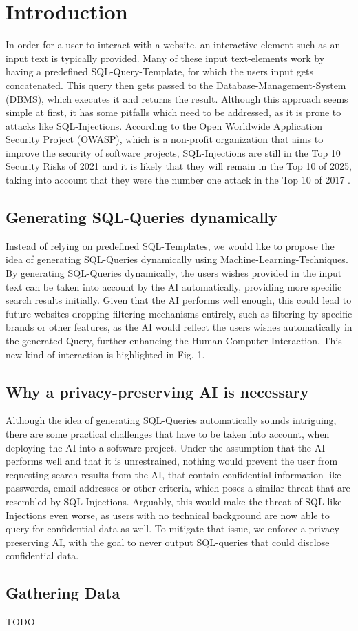 \documentclass[../../submission.tex]{subfiles}
\begin{document}
\section{Introduction}
In order for a user to interact with a website, an interactive element such as 
an input text is typically provided. Many of these input text-elements work by
having a predefined SQL-Query-Template, for which the users input gets concatenated.
This query then gets passed to the Database-Management-System (DBMS), which executes
it and returns the result. Although this approach seems simple at first, it has 
some pitfalls which need to be addressed, as it is prone to attacks like SQL-Injections.
According to the Open Worldwide Application Security Project (OWASP), which is a 
non-profit organization that aims to improve the security of software projects,
SQL-Injections are still in the Top 10 Security Risks of 2021 and it is likely that 
they will remain in the Top 10 of 2025, taking into account that they were the number
one attack in the Top 10 of 2017 \cite{owaspfoundationOWASPTopTen2024}.
\subsection{Generating SQL-Queries dynamically}
Instead of relying on predefined SQL-Templates, we would like to propose the 
idea of generating SQL-Queries dynamically using Machine-Learning-Techniques.\\
By generating SQL-Queries dynamically, the users wishes provided in the input text can 
be taken into account by the AI automatically, providing more specific search results initially.
Given that the AI performs well enough, this could lead to future websites dropping 
filtering mechanisms entirely, such as filtering by specific brands or other features,
as the AI would reflect the users wishes automatically in the generated Query, 
further enhancing the Human-Computer Interaction. This new kind of interaction is highlighted
in Fig. 1.
\subsection{Why a privacy-preserving AI is necessary}
Although the idea of generating SQL-Queries automatically sounds intriguing, there 
are some practical challenges that have to be taken into account, when deploying the AI 
into a software project. Under the assumption
that the AI performs well and that it is unrestrained, nothing would prevent the user
from requesting search results from the AI, that contain confidential information like 
passwords, email-addresses or other criteria, which poses a similar threat that 
are resembled by SQL-Injections. Arguably, this would make the threat of SQL like 
Injections even worse, as users with no technical background are now able to query 
for confidential data as well. To mitigate that issue, we enforce a privacy-preserving AI,
with the goal to never output SQL-queries that could disclose confidential data.
\subsection{Gathering Data}
TODO
\end{document}
